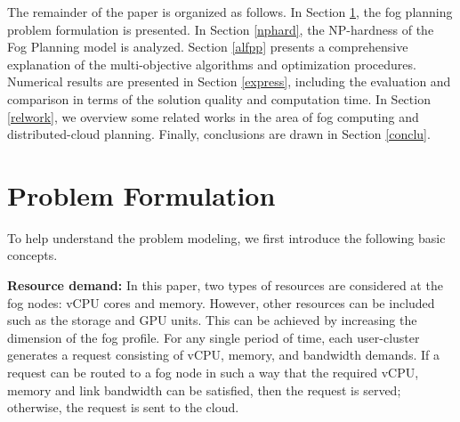 \documentclass[10pt,journal,compsoc]{IEEEtran}
\begin{document}


The remainder of the paper is organized as follows. In Section \ref{probfor}, the fog planning problem formulation is presented. In Section \ref{nphard}, the NP-hardness of the Fog Planning model is analyzed. Section \ref{alfpp} presents a comprehensive explanation of the multi-objective algorithms and optimization procedures. 
Numerical results are presented in Section \ref{express}, including the evaluation and comparison in terms of the solution quality and computation time. In Section \ref{relwork}, we overview some related works in the area of fog computing and distributed-cloud planning. Finally, conclusions are drawn in Section \ref{conclu}.

\section{Problem Formulation}\label{probfor}
To help understand the problem modeling, we first introduce the following basic concepts.



\textbf{Resource demand: }In this paper, two types of resources are considered at the fog nodes: vCPU cores and memory. 
However, other resources can be included such as the storage and GPU units. This can be achieved by increasing the dimension of the fog profile. For any single period of time, each user-cluster generates a request consisting of vCPU, memory, and bandwidth demands. If a request can be routed to a fog node in such a way that the required vCPU, memory and link bandwidth can be satisfied, then the request is served; otherwise, the request is sent to the cloud. 
\end{document}
